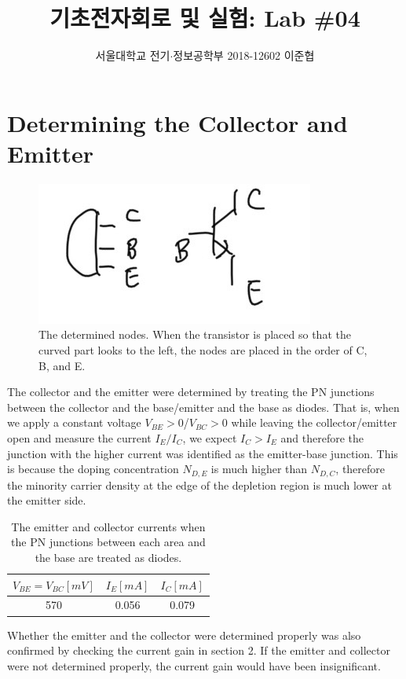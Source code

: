 \documentclass[a4paper, itemph]{oblivoir}
\theoremstyle{definition}
\begin{document}
\title{기초전자회로 및 실험: Lab \#04}
\author{서울대학교 전기$\cdot$정보공학부 2018-12602 이준협}
\maketitle

\section{Determining the Collector and Emitter}
\begin{figure}[htb]
    \centering
    \includegraphics[width=0.3\linewidth]{cbe.JPG}
    \caption{The determined nodes. When the transistor is placed so that the curved part looks to the left, the nodes are placed in the order of C, B, and E.}
\end{figure}

The collector and the emitter were determined by treating the PN junctions between the collector and the base/emitter and the base as diodes. That is, when we apply a constant voltage $V_{BE}>0$/$V_{BC}>0$ while leaving the collector/emitter open and measure the current $I_E/I_C$, we expect $I_C>I_E$ and therefore the junction with the higher current was identified as the emitter-base junction. This is because the doping concentration $N_{D,E}$ is much higher than $N_{D,C}$, therefore the minority carrier density at the edge of the depletion region is much lower at the emitter side.
\begin{table}[htb]
    \centering
    \begin{tabular}{c|c|c}
        $V_{BE}=V_{BC}[mV]$ & $I_E[mA]$ & $I_C[mA]$\\
        \hline
        570 & 0.056 & 0.079
    \end{tabular}
    \caption{The emitter and collector currents when the PN junctions between each area and the base are treated as diodes.}
\end{table}

Whether the emitter and the collector were determined properly was also confirmed by checking the current gain in section 2. If the emitter and collector were not determined properly, the current gain would have been insignificant.
\end{document}
